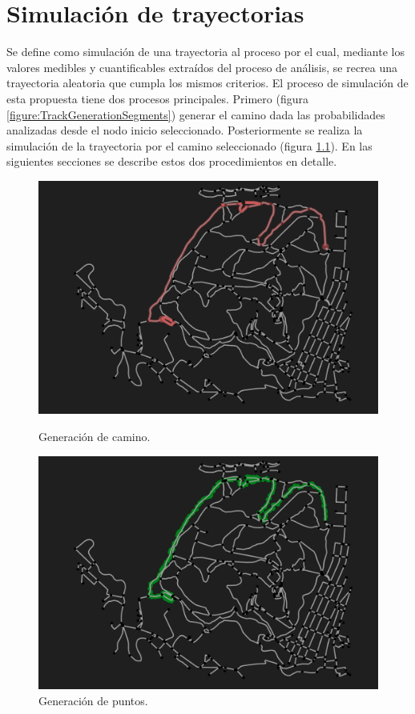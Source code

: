 \chapter{Simulación de trayectorias} \label{chapter:Simulation}
Se define como simulación de una trayectoria al proceso por el cual, mediante los 
valores medibles y cuantificables extraídos del proceso de análisis, se recrea una 
trayectoria aleatoria que cumpla los mismos criterios. El proceso de simulación de esta 
propuesta tiene dos procesos principales. Primero (figura
\ref{figure:TrackGenerationSegments}) generar el camino dada las probabilidades 
analizadas desde el nodo inicio seleccionado. Posteriormente se realiza la simulación 
de la trayectoria por el camino seleccionado (figura \ref{figure:TrackGenerationPoints}).
En las siguientes secciones se describe estos dos procedimientos en detalle.
\begin{figure}[!htb]
\begin{minipage}{0.48\textwidth}
\centering
\includegraphics[width=1\textwidth]{./Imagenes/TrackGenerationSegments.png}
\caption{Generación de camino.}
\label{figure:TrackGenerationSegments}
\end{minipage}\hfill
\begin{minipage}{0.48\textwidth}
\centering
\includegraphics[width=1\textwidth]{./Imagenes/TrackGenerationPoints.png}
\caption{Generación de puntos.}
\label{figure:TrackGenerationPoints}
\end{minipage}
\end{figure}


